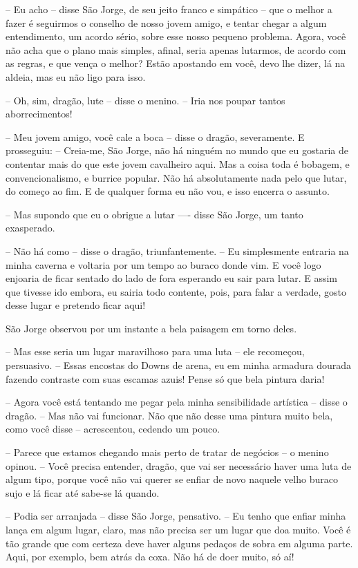 -- Eu acho -- disse São Jorge, de seu jeito franco e simpático -- que o
melhor a fazer é seguirmos o conselho de nosso jovem amigo, e tentar
chegar a algum entendimento, um acordo sério, sobre esse nosso
pequeno problema. Agora, você não acha que o plano mais simples,
afinal, seria apenas lutarmos, de acordo com as regras, e que vença o
melhor? Estão apostando em você, devo lhe dizer, lá na aldeia, mas eu
não ligo para isso.

-- Oh, sim, dragão, lute -- disse o menino. -- Iria nos poupar tantos
aborrecimentos!

-- Meu jovem amigo, você cale a boca -- disse o dragão, severamente. E
prosseguiu: -- Creia-me, São Jorge, não há ninguém no mundo que eu
gostaria de contentar mais do que este jovem cavalheiro aqui. Mas a
coisa toda é bobagem, e convencionalismo, e burrice popular. Não há
absolutamente nada pelo que lutar, do começo ao fim. E de qualquer
forma eu não vou, e isso encerra o assunto.

-- Mas supondo que eu o obrigue a lutar ---- disse São Jorge, um tanto
exasperado.

-- Não há como -- disse o dragão, triunfantemente. -- Eu simplesmente
entraria na minha caverna e voltaria por um tempo ao buraco donde
vim. E você logo enjoaria de ficar sentado do lado de fora esperando
eu sair para lutar. E assim que tivesse ido embora, eu sairia todo
contente, pois, para falar a verdade, gosto desse lugar e pretendo
ficar aqui!

São Jorge observou por um instante a bela paisagem em torno deles.

-- Mas esse seria um lugar maravilhoso para uma luta -- ele recomeçou,
persuasivo. -- Essas encostas do Downs de arena, eu em minha armadura
dourada fazendo contraste com suas escamas azuis! Pense só que bela
pintura daria!

-- Agora você está tentando me pegar pela minha sensibilidade artística
-- disse o dragão. -- Mas não vai funcionar. Não que não desse uma
pintura muito bela, como você disse -- acrescentou, cedendo um pouco.

-- Parece que estamos chegando mais perto de tratar de negócios -- o
menino opinou. -- Você precisa entender, dragão, que vai ser
necessário haver uma luta de algum tipo, porque você não vai querer
se enfiar de novo naquele velho buraco sujo e lá ficar até sabe-se lá
quando.

-- Podia ser arranjada -- disse São Jorge, pensativo. -- Eu tenho que
enfiar minha lança em algum lugar, claro, mas não precisa ser um
lugar que doa muito. Você é tão grande que com certeza deve haver
alguns pedaços de sobra em alguma parte. Aqui, por exemplo, bem atrás
da coxa. Não há de doer muito, só aí!

